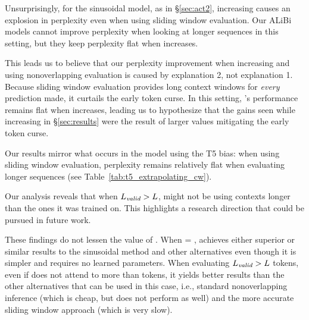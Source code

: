 Unsurprisingly, for the sinusoidal model, as in \S\ref{sec:act2}, increasing \li causes an explosion in perplexity even when using sliding window evaluation.
Our ALiBi models cannot improve perplexity when looking at longer sequences in this setting, but they keep perplexity flat when \li increases.

This leads us to believe that our perplexity improvement when increasing \li and using nonoverlapping evaluation is caused by explanation 2, not explanation 1. Because sliding window evaluation provides long context windows for \emph{every} prediction made, it curtails the early token curse. In this setting, \al's performance remains flat when \li increases, leading us to hypothesize that the gains seen while increasing \li in \S\ref{sec:results} were the result of larger \li values mitigating the early token curse. 

Our \al results mirror what occurs in the model using the T5 bias: when using sliding window evaluation, perplexity remains relatively flat when evaluating longer sequences (see Table~\ref{tab:t5_extrapolating_cw}). 





Our analysis reveals that when $L_{\textit{valid}} > L$, \al might not be using contexts longer than the ones it was trained on. This highlights a research direction that could be pursued in future work.

These findings do not lessen the value of \al.  When \li = \lt, \al achieves either superior or similar results to the sinusoidal method and other alternatives even though it is simpler and requires no learned parameters.
When evaluating $L_{\textit{valid}} > L$ tokens, even if \al does not attend to more than \lt tokens, it yields better results than the other alternatives that can be used in this case, i.e., standard nonoverlapping inference (which is cheap, but does not perform as well) and the more accurate sliding window approach (which is very slow). 









